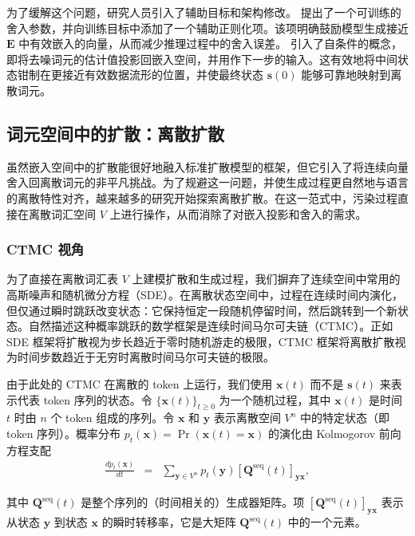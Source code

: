 \documentclass[UTF8,a4paper,zihao=-4,oneside,openany]{ctexbook}
\begin{document}
为了缓解这个问题，研究人员引入了辅助目标和架构修改。\citet{li-etal:2022diffusion} 提出了一个可训练的舍入参数，并向训练目标中添加了一个辅助正则化项。该项明确鼓励模型生成接近 $\mathbf{E}$ 中有效嵌入的向量，从而减少推理过程中的舍入误差。\citet{strudel-etal:2022self} 引入了自条件的概念，即将去噪词元的估计值投影回嵌入空间，并用作下一步的输入。这有效地将中间状态钳制在更接近有效数据流形的位置，并使最终状态 $\mathbf{s}(0)$ 能够可靠地映射到离散词元。
\subsection{词元空间中的扩散：离散扩散}

虽然嵌入空间中的扩散能很好地融入标准扩散模型的框架，但它引入了将连续向量舍入回离散词元的非平凡挑战。为了规避这一问题，并使生成过程更自然地与语言的离散特性对齐，越来越多的研究开始探索离散扩散。在这一范式中，污染过程直接在离散词汇空间 $V$ 上进行操作，从而消除了对嵌入投影和舍入的需求。
\subsubsection{CTMC 视角}
\label{sec:the-ctmc-perspective}

为了直接在离散词汇表 $V$ 上建模扩散和生成过程，我们摒弃了连续空间中常用的高斯噪声和随机微分方程（SDE）。在离散状态空间中，过程在连续时间内演化，但仅通过瞬时跳跃改变状态：它保持恒定一段随机停留时间，然后跳转到一个新状态。自然描述这种概率跳跃的数学框架是连续时间马尔可夫链（CTMC）。正如 SDE 框架将扩散视为步长趋近于零时随机游走的极限，CTMC 框架将离散扩散视为时间步数趋近于无穷时离散时间马尔可夫链的极限。

由于此处的 CTMC 在离散的 token 上运行，我们使用 $\mathbf{x}(t)$ 而不是 $\mathbf{s}(t)$ 来表示代表 token 序列的状态。令 $\{\mathbf{x}(t)\}_{t \ge 0}$ 为一个随机过程，其中 $\mathbf{x}(t)$ 是时间 $t$ 时由 $n$ 个 token 组成的序列。令 $\mathbf{x}$ 和 $\mathbf{y}$ 表示离散空间 $V^n$ 中的特定状态（即 token 序列）。概率分布 $p_t(\mathbf{x}) = \Pr(\mathbf{x}(t)=\mathbf{x})$ 的演化由 Kolmogorov 前向方程支配
\begin{eqnarray}
\frac{d p_t(\mathbf{x})}{dt} & = & \sum_{\mathbf{y} \in V^n} p_t(\mathbf{y}) [\mathbf{Q}^{\mathrm{seq}}(t)]_{\mathbf{y}\mathbf{x}}, \label{eq:ctmc-equation}
\end{eqnarray}

\noindent 其中 $\mathbf{Q}^{\mathrm{seq}}(t)$ 是整个序列的（时间相关的）生成器矩阵。项 $[\mathbf{Q}^{\mathrm{seq}}(t)]_{\mathbf{y}\mathbf{x}}$ 表示从状态 $\mathbf{y}$ 到状态 $\mathbf{x}$ 的瞬时转移率，它是大矩阵 $\mathbf{Q}^{\mathrm{seq}}(t)$ 中的一个元素。
\end{document}
